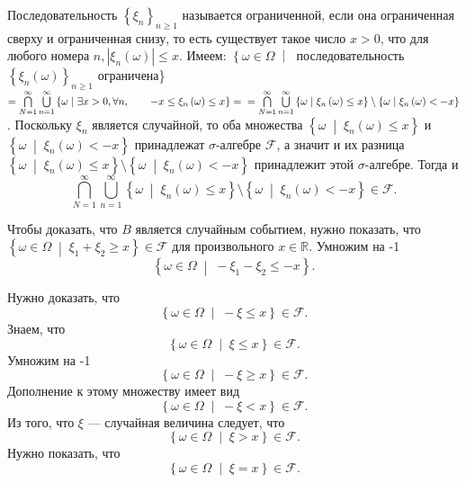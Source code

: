 Последовательность $ \left\{ \xi_n \right\}_{n \geq 1}$ называется ограниченной, если она ограниченная сверху и ограниченная снизу, то есть существует такое число $x > 0$, что для любого номера $n, \left| \xi_n \left( \omega \right) \right| \leq x$.
Имеем: $ \left\{ \omega \in \Omega \; \middle| \; \right.$ последовательность $ \left\{ \xi_n \left( \omega \right) \right\}_{n \geq 1}$ ограничена\} $=
\bigcap \limits_{N=1}^{ \infty } \bigcup \limits_{n=1}^{ \infty }
\left\{ \omega \; \middle| \; \exists x > 0, \forall n, \qquad -x \leq \xi_n \left( \omega \right) \leq x \right\} = \\
= \bigcap \limits_{N=1}^{ \infty } \bigcup \limits_{n=1}^{ \infty }
\left\{ \omega \; \middle| \; \xi_n \left( \omega \right) \leq x \right\} \setminus \left\{ \omega \; \middle| \; \xi_n \left( \omega \right) < - x \right\} $.
Поскольку $ \xi_n $ является случайной,
то оба множества $ \left\{ \omega \; \middle| \; \xi_n \left( \omega \right) \leq x \right\} $ и
$ \left\{ \omega \; \middle| \; \xi_n \left( \omega \right) < - x \right\} $ принадлежат $ \sigma $-алгебре $ \mathcal{F} $,
а значит и их разница
$ \left\{ \omega \; \middle| \; \xi_n \left( \omega \right) \leq x \right\} \setminus \left\{ \omega \; \middle| \; \xi_n \left( \omega \right) < - x \right\} $
принадлежит этой $ \sigma $-алгебре.
Тогда и
$$ \bigcap \limits_{N=1}^{ \infty } \bigcup \limits_{n=1}^{ \infty }
\left\{ \omega \; \middle| \; \xi_n \left( \omega \right) \leq x \right\} \setminus
\left\{ \omega \; \middle| \; \xi_n \left( \omega \right) < - x \right\} \in \mathcal{F}.$$

Чтобы доказать, что $B$ является случайным событием, нужно показать,
что $ \left\{ \omega \in \Omega \; \middle| \; \xi_1 + \xi_2 \geq x \right\} \in \mathcal{F} $ для произвольного $x \in \mathbb{R} $.
Умножим на -1
$$ \left\{ \omega \in \Omega \; \middle| \; - \xi_1 - \xi_2 \leq - x \right\}.$$

Нужно доказать, что
$$ \left\{ \omega \in \Omega \; \middle| \; - \xi \leq x \right\} \in \mathcal{F}.$$
Знаем, что
$$ \left\{ \omega \in \Omega \; \middle| \; \xi \leq x \right\} \in \mathcal{F}.$$
Умножим на -1
$$ \left\{ \omega \in \Omega \; \middle| \; - \xi \geq x \right\} \in \mathcal{F}.$$
Дополнение к этому множеству имеет вид
$$ \left\{ \omega \in \Omega \; \middle| \; - \xi < x \right\} \in \mathcal{F}.$$
Из того, что $ \xi $ --- случайная величина следует, что
$$ \left\{ \omega \in \Omega \; \middle| \; \xi > x \right\} \in \mathcal{F}.$$
Нужно показать, что 
$$ \left\{ \omega \in \Omega \; \middle| \; \xi = x \right\} \in \mathcal{F}.$$

